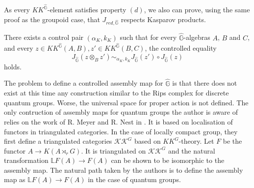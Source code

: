 As every $KK^{\hat{\mathbb G}}$-element satisfies property $(d)$, we also can prove, using the same proof as the groupoid case, that $J_{red,\hat{\mathbb G}}$ respects Kasparov products.

\begin{prop} There exists a control pair $(\alpha_K,k_K)$ such that for every $\hat{\mathbb G}$-algebras $A$, $B$ and $C$, and every $z\in KK^{\hat{\mathbb G}}(A,B),z'\in KK^{\hat{\mathbb G}}(B,C)$, the controlled equality
\[J_{\hat{\mathbb G}}(z\otimes_B z') \sim_{\alpha_K,k_K} J_{\hat{\mathbb G}}(z')\circ J_{\hat{\mathbb G}}(z)\]
holds.
\end{prop}

The problem to define a controlled assembly map for $\hat{\mathbb G}$ is that there does not exist at this time any construction similar to the Rips complex for discrete quantum groups. Worse, the universal space for proper action is not defined. The only contruction of assembly maps for quantum groups the author is aware of relies on the work of R. Meyer and R. Nest in \cite{MeyerNest}. It is based on localisation of functors in triangulated categories. In the case of locally compact group, they first define a triangulated categories $\mathcal {KK}^G$ based on $KK^G$-theory. Let $F$ be the functor $A\rightarrow K(A \rtimes_r G)$. It is triangulated on $\mathcal {KK}^G$ and the natural transformation $\mathbb L F(A)\rightarrow F(A)$ can be shown to be isomorphic to the assembly map. The natural path taken by the authors is to define the assembly map as $\mathbb L F(A)\rightarrow F(A)$ in the case of quantum groups.





























   
